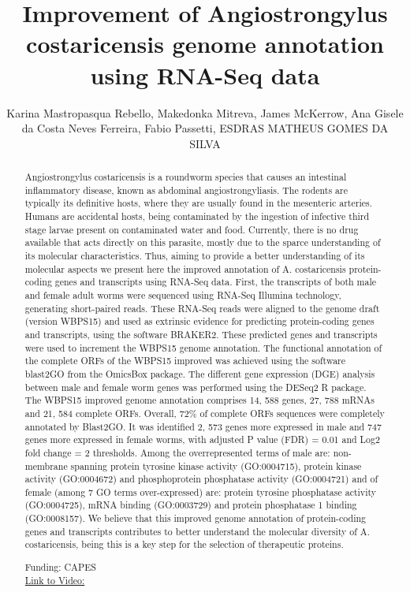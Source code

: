 \documentclass[twoside]{article}
\title{\vspace{-15mm}\fontsize{24pt}{10pt}\selectfont\textbf{ Improvement of Angiostrongylus costaricensis genome annotation using RNA-Seq data }} %
\author{ Karina Mastropasqua Rebello,  Makedonka Mitreva,  James McKerrow,  Ana Gisele da Costa Neves Ferreira,  Fabio Passetti,  ESDRAS MATHEUS GOMES DA SILVA }
\affil{ IOC/Fiocruz }
\date{}
\begin{document}
  
  
  \maketitle %
  
  
  \thispagestyle{fancy} %
  
  
  \begin{abstract}
  Angiostrongylus costaricensis is a roundworm species that causes an intestinal inflammatory disease,  known as abdominal angiostrongyliasis. The rodents are typically its definitive hosts,  where they are usually found in the mesenteric arteries. Humans are accidental hosts,  being contaminated by the ingestion of infective third stage larvae present on contaminated water and food. Currently,  there is no drug available that acts directly on this parasite,  mostly due to the sparce understanding of its molecular characteristics. Thus,  aiming to provide a better understanding of its molecular aspects we present here the improved annotation of A. costaricensis protein-coding genes and transcripts using RNA-Seq data. First,  the transcripts of both male and female adult worms were sequenced using RNA-Seq Illumina technology,  generating short-paired reads. These RNA-Seq reads were aligned to the genome draft (version WBPS15) and used as extrinsic evidence for predicting protein-coding genes and transcripts,  using the software BRAKER2. These predicted genes and transcripts were used to increment the WBPS15 genome annotation. The functional annotation of the complete ORFs of the WBPS15 improved was achieved using the software blast2GO from the OmicsBox package. The different gene expression (DGE) analysis between male and female worm genes was performed using the DESeq2 R package. The WBPS15 improved genome annotation comprises 14, 588 genes,  27, 788 mRNAs and 21, 584 complete ORFs. Overall,  72\% of complete ORFs sequences were completely annotated by Blast2GO. It was identified 2, 573 genes more expressed in male and 747 genes more expressed in female worms,  with adjusted P value (FDR) = 0.01 and Log2 fold change = 2 thresholds. Among the overrepresented terms of male are: non-membrane spanning protein tyrosine kinase activity (GO:0004715),  protein kinase activity (GO:0004672) and phosphoprotein phosphatase activity (GO:0004721) and of female (among 7 GO terms over-expressed) are: protein tyrosine phosphatase activity (GO:0004725),  mRNA binding (GO:0003729) and protein phosphatase 1 binding (GO:0008157). We believe that this improved genome annotation of protein-coding genes and transcripts contributes to better understand the molecular diversity of A. costaricensis,  being this is a key step for the selection of therapeutic proteins.
  
  Funding: CAPES \\
  \href{http://ab3c.org.br/xpress_pres2020/xmxp2020-305446.html}{Link to Video:}

  \end{abstract}
   
  
\end{document}

